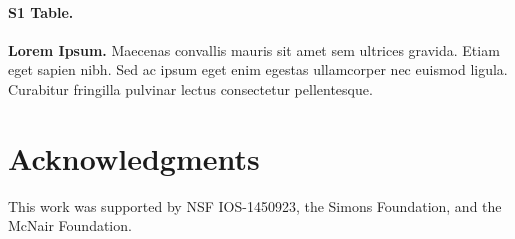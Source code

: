 \documentclass[10pt,letterpaper]{article}
\begin{document}
\paragraph*{S1 Table.}
\label{S1_Table}
{\bf Lorem Ipsum.} Maecenas convallis mauris sit amet sem ultrices gravida.
Etiam eget sapien nibh. Sed ac ipsum eget enim egestas ullamcorper nec euismod
ligula. Curabitur fringilla pulvinar lectus consectetur pellentesque.

\section*{Acknowledgments}

This work was supported by NSF IOS-1450923, the Simons Foundation, and the
McNair Foundation.

\nolinenumbers

%
%
% 


\end{document}
